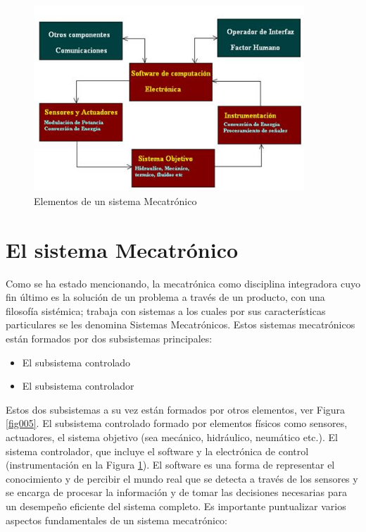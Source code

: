 \documentclass[12pt]{book}
\theoremstyle{definition}
\theoremstyle{remark}
\theoremstyle{plain}
\begin{document}
\begin{figure}
\centering
\includegraphics[width=4in]{sistemamecatronico.jpg}
\caption{Elementos de un sistema Mecatrónico}
\label{fig004}
\end{figure}

\section{El sistema Mecatrónico}

Como se ha estado mencionando, la mecatrónica como disciplina integradora cuyo fin último es la solución de un problema a través de un producto, con una filosofía sistémica; trabaja con sistemas a los cuales por sus características particulares se les denomina Sistemas Mecatrónicos. Estos sistemas mecatrónicos están formados por dos subsistemas principales:

\begin{itemize}
\item El subsistema controlado
\item El subsistema controlador
\end{itemize}

Estos dos subsistemas a su vez están formados por otros elementos, ver Figura \ref{fig005}. El subsistema controlado formado por elementos físicos como sensores, actuadores, el sistema objetivo (sea mecánico, hidráulico, neumático etc.). El sistema controlador, que incluye el software y la electrónica de control (instrumentación en la Figura \ref{fig004}). El software es una forma de representar el conocimiento y de percibir el mundo real que se detecta a través de los sensores y se encarga de procesar la información y de tomar las decisiones necesarias para un desempeño eficiente del sistema completo. Es importante puntualizar varios aspectos fundamentales de un sistema mecatrónico:
\end{document}
